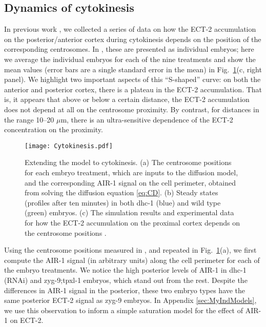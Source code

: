 \documentclass[11pt]{article}
\begin{document}
\subsection{Dynamics of cytokinesis}
In previous work \citep{longhini2022aurora}, we collected a series of data on how the ECT-2 accumulation on the posterior/anterior cortex during cytokinesis depends on the position of the corresponding centrosomes. In \citep[Fig.~7A]{longhini2022aurora}, these are presented as individual embryos; here we average the individual embryos for each of the nine treatments and show the mean values (error bars are a single standard error in the mean) in Fig.\ \ref{fig:CytoSit}(c, right panel). We highlight two important aspects of this ``S-shaped'' curve: on both the anterior and posterior cortex, there is a plateau in the ECT-2 accumulation. That is, it appears that above or below a certain distance, the ECT-2 accumulation does not depend at all on the centrosome proximity. By contrast, for distances in the range 10--20 $\mu$m, there is an ultra-sensitive dependence of the ECT-2 concentration on the proximity. 

\begin{figure}
\centering
\texttt{[image: Cytokinesis.pdf]}
\caption{\label{fig:CytoSit} Extending the model to cytokinesis. (a) The centrosome positions for each embryo treatment, which are inputs to the diffusion model, and the corresponding AIR-1 signal on the cell perimeter, obtained from solving the diffusion equation \eqref{eq:CD}. (b) Steady states (profiles after ten minutes)  in both dhc-1 (blue) and wild type (green) embryos. (c) The simulation results and experimental data for how the ECT-2 accumulation on the proximal cortex depends on the centrosome positions \citep[Fig.~7A]{longhini2022aurora}. }
\end{figure}

Using the centrosome positions measured in \citep{longhini2022aurora}, and repeated in Fig.\ \ref{fig:CytoSit}(a), we first compute the AIR-1 signal (in arbitrary units) along the cell perimeter for each of the embryo treatments. We notice the high posterior levels of AIR-1 in dhc-1 (RNAi) and zyg-9;tpxl-1 embryos, which stand out from the rest. Despite the differences in AIR-1 signal in the posterior, these two embryo types have the same posterior ECT-2 signal as zyg-9 embryos. In Appendix \ref{sec:MyIndModels}, we use this observation to inform a simple saturation model for the effect of AIR-1 on ECT-2.
\end{document}
